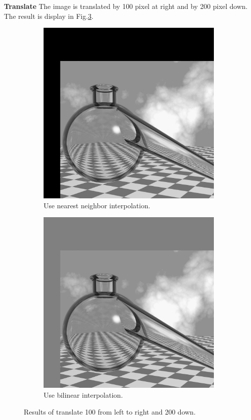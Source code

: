 \textbf{Translate} The image is translated by 100 pixel at right and by 200 pixel down. The result is display in Fig.\ref{fig:translate}. 
\begin{figure}[h!]
	\centering
	\begin{subfigure}[b]{0.45\linewidth}
		\includegraphics[width=\linewidth]{myfigure/p6/translation_ne.png}
		\caption{Use nearest neighbor interpolation.}
		\label{fig:translate_ne}
	\end{subfigure}
  	\begin{subfigure}[b]{0.45\linewidth}
		\includegraphics[width=\linewidth]{myfigure/p6/translation_bi.png}
		\caption{Use bilinear interpolation.}
		\label{fig:translate_bi}
	\end{subfigure}
  	\caption{Results of translate 100 from left to right and 200 down.}
  	\label{fig:translate}
\end{figure}

